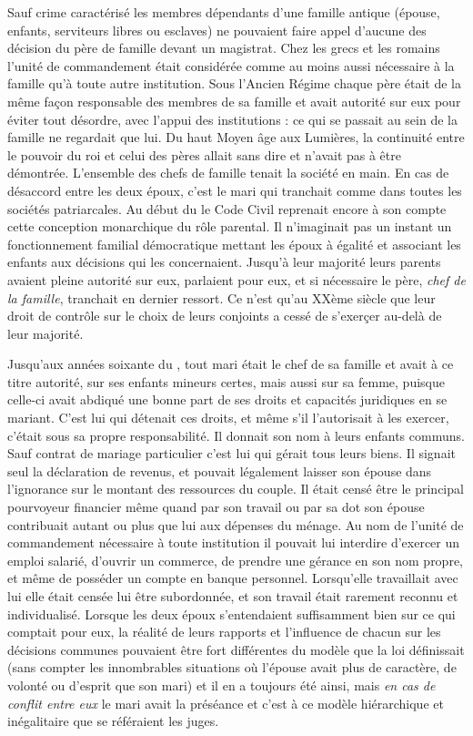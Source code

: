  Sauf crime caractérisé les membres dépendants d'une famille antique (épouse, enfants, serviteurs libres ou esclaves) ne pouvaient faire appel d'aucune des décision du père de famille devant un magistrat. Chez les grecs et les romains l'unité de commandement était considérée comme au moins aussi nécessaire à la famille qu'à toute autre institution. Sous l'Ancien Régime chaque père était de la même façon responsable des membres de sa famille et avait autorité sur eux pour éviter tout désordre, avec l'appui des institutions : ce qui se passait au sein de la famille ne regardait que lui. Du haut Moyen âge aux Lumières, la continuité entre le pouvoir du roi et celui des pères allait sans dire et n'avait pas à être démontrée. L'ensemble des chefs de famille tenait la société en main. En cas de désaccord entre les deux époux, c'est le mari qui tranchait comme dans toutes les sociétés patriarcales. Au début du  le Code Civil reprenait encore à son compte cette conception monarchique du rôle parental. Il n'imaginait pas un instant un fonctionnement familial démocratique mettant les époux à égalité et associant les enfants aux décisions qui les concernaient. Jusqu'à leur majorité  leurs parents avaient pleine autorité sur eux, parlaient pour eux, et si nécessaire le père, \emph{chef de la famille}, tranchait en dernier ressort. Ce n'est qu'au XXème siècle que leur droit de contrôle sur le choix de leurs conjoints a cessé de s'exerçer au-delà de leur majorité.
 
 
 

  Jusqu'aux années soixante du , tout mari était le chef de sa famille et avait à ce titre autorité, sur ses enfants mineurs certes, mais aussi sur sa femme, puisque celle-ci avait abdiqué une bonne part de ses droits et capacités juridiques en se mariant. C'est lui qui détenait ces droits, et même s'il l'autorisait à les exercer, c'était sous sa propre responsabilité. Il donnait son nom à leurs enfants communs. Sauf contrat de mariage particulier c'est lui qui gérait tous leurs biens. Il signait seul la déclaration de revenus, et pouvait légalement laisser son épouse dans l'ignorance sur le montant des ressources du couple. Il était censé être le principal pourvoyeur financier même quand par son travail ou par sa dot son épouse contribuait autant ou plus que lui aux dépenses du ménage. Au nom de l'unité de commandement nécessaire à toute institution il pouvait lui interdire d'exercer un emploi salarié, d'ouvrir un commerce, de prendre une gérance en son nom propre, et même de posséder un compte en banque personnel. Lorsqu'elle travaillait avec lui elle était censée lui être subordonnée, et son travail était rarement reconnu et individualisé. 
Lorsque les deux époux s'entendaient suffisamment bien sur ce qui comptait pour eux, la réalité de leurs rapports et l'influence de chacun sur les décisions communes pouvaient être fort différentes du modèle que la loi définissait (sans compter les innombrables situations où l'épouse avait plus de caractère, de volonté ou d'esprit que son mari) et il en a toujours été ainsi, mais \emph{en cas de conflit entre eux} le mari avait la préséance et c'est à ce modèle hiérarchique et inégalitaire que se référaient les juges.

